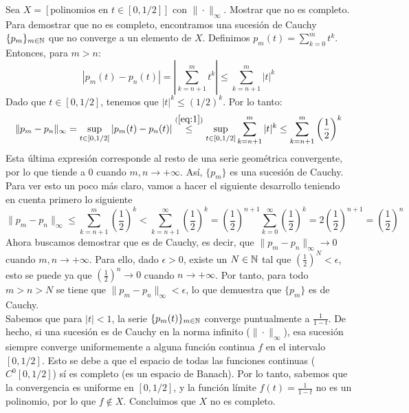 \begin{ejercicio}
    Sea $X = [\text{polinomios en } t \in [0, 1/2]]$ con $\|\cdot\|_\infty$. Mostrar que no es completo. \\

    \noindent
    Para demostrar que no es completo, encontramos una sucesión de Cauchy $\{p_m\}_{m\in \mathbb{N}}$ que no converge a un elemento de $X$.
    Definimos $p_m(t) = \sum\limits_{k=0}^m t^k$. Entonces, para $m > n$:
    \begin{equation}\label{eq:1}
        |p_m(t) - p_n(t)| = \left| \sum_{k=n+1}^m t^k \right| \leq \sum_{k=n+1}^m |t|^k 
    \end{equation}
    Dado que $t \in [0, 1/2]$, tenemos que $|t|^k \leq (1/2)^k$. Por lo tanto:
    \begin{equation*}
        \|p_m - p_n\|_\infty = \sup_{t \in [0, 1/2]} |p_m(t) - p_n(t)| \overset{(\ref{eq:1})}{\leq} \sup_{t \in [0, 1/2]} \sum_{k=n+1}^m |t|^k \leq \sum_{k=n+1}^m \left( \frac{1}{2} \right)^k 
    \end{equation*}
    Esta última expresión corresponde al resto de una serie geométrica convergente, por lo que tiende a $0$ cuando $m, n \to +\infty$. Así, $\{p_m\}$ es una sucesión de Cauchy. Para ver esto un poco más claro, vamos a hacer el siguiente desarrollo teniendo en cuenta primero lo siguiente
    \begin{equation*}
        \|p_m - p_n\|_\infty \leq \sum_{k=n+1}^m \left( \frac{1}{2} \right)^k < \sum_{k=n+1}^{\infty} \left( \frac{1}{2} \right)^k = \left( \frac{1}{2} \right)^{n+1} \sum_{k=0}^{\infty} \left( \frac{1}{2} \right)^k = 2 \left( \frac{1}{2} \right)^{n+1} = \left( \frac{1}{2} \right)^{n}
    \end{equation*}
    Ahora buscamos demostrar que es de Cauchy, es decir, que $\|p_m - p_n\|_\infty \to 0$ cuando $m, n \to +\infty$. Para ello, dado $\epsilon > 0$, existe un $N \in \mathbb{N}$ tal que $\left( \frac{1}{2} \right)^{N} < \epsilon$, esto se puede ya que $\left( \frac{1}{2} \right)^{n} \to 0$ cuando $n \to +\infty$. Por tanto, para todo $m > n > N$ se tiene que $\|p_m - p_n\|_\infty < \epsilon$, lo que demuestra que $\{p_m\}$ es de Cauchy. \\

    \noindent
    Sabemos que para $|t| < 1$, la serie $\{p_m(t)\}_{m\in\mathbb{N}}$ converge puntualmente a $\frac{1}{1-t}$. De hecho, si una sucesión es de Cauchy en la norma infinito ($\|\cdot\|_\infty$), esa sucesión siempre converge uniformemente a alguna función continua $f$ en el intervalo $[0, 1/2]$. Esto se debe a que el espacio de todas las funciones continuas ($C^0[0, 1/2]$) sí es completo (es un espacio de Banach). Por lo tanto, sabemos que la convergencia es uniforme en $[0, 1/2]$, y la función límite $f(t) = \frac{1}{1-t}$ no es un polinomio, por lo que $f \notin X$. Concluimos que $X$ no es completo.
\end{ejercicio}

